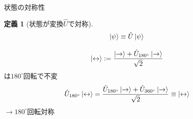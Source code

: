 \documentclass[dvipdfm]{beamer}
\newtheorem*{defn}{定義}
\begin{document}
\begin{frame}{状態の対称性}
    \begin{defn}[状態が変換$\hat{U}$で対称]
        \begin{equation*}
            \ket{\psi}
            \equiv
            \hat{U}\ket{\psi}
        \end{equation*}
    \end{defn}
    \begin{example}
        \begin{equation*}
            \ket{\leftrightarrow}
            :=
            \frac{\ket{\rightarrow}+\hat{U}_{180^\circ}\ket{\rightarrow}}{\sqrt{2}}
        \end{equation*}
        は$180^\circ$回転で不変
        \begin{equation*}
            \hat{U}_{180^\circ}\ket{\leftrightarrow}
            =
            \frac{\hat{U}_{180^\circ}\ket{\rightarrow}+\hat{U}_{360^\circ}\ket{\rightarrow}}{\sqrt{2}}
            \equiv
            \ket{\leftrightarrow}
        \end{equation*}
        $\longrightarrow180^\circ$回転対称
    \end{example}
\end{frame}
\end{document}
